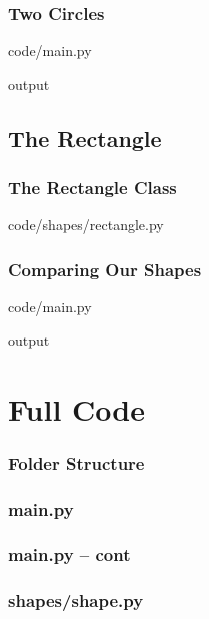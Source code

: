 \documentclass{beamer}
\newcommand{\closenewline}{%
  \par\nopagebreak
  \vspace{-\itemsep}
  \vspace{-\parsep}
}
\begin{document}
  \begin{frame}
  \frametitle{Two Circles}

  code/main.py
  

  output
  
  \end{frame}


\subsection{The Rectangle}
  \begin{frame}
  \frametitle{The Rectangle Class}
  code/shapes/rectangle.py
  
  \end{frame}

  \begin{frame}
  \frametitle{Comparing Our Shapes}

  code/main.py
  
  \closenewline
  

  output
  
  \closenewline
  
  \end{frame}

\appendix
\section{Full Code}
  \begin{frame}
  \frametitle{Folder Structure}
  \end{frame}

  \begin{frame}
  \frametitle{main.py}
  
  \end{frame}

  \begin{frame}
  \frametitle{main.py -- cont}
  
  \end{frame}

  \begin{frame}
  \frametitle{shapes/shape.py}
  
  \end{frame}
\end{document}
